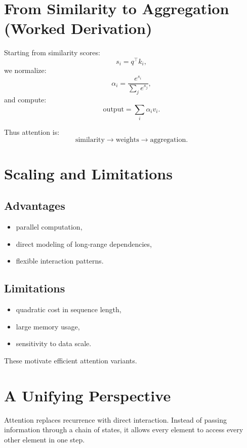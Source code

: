 \section{From Similarity to Aggregation (Worked Derivation)}

Starting from similarity scores:
\[
s_i = q^\top k_i,
\]
we normalize:
\[
\alpha_i = \frac{e^{s_i}}{\sum_j e^{s_j}},
\]
and compute:
\[
\mathrm{output} = \sum_i \alpha_i v_i.
\]

Thus attention is:
\[
\text{similarity} \to \text{weights} \to \text{aggregation}.
\]

\section{Scaling and Limitations}

\subsection{Advantages}

\begin{itemize}
    \item parallel computation,
    \item direct modeling of long-range dependencies,
    \item flexible interaction patterns.
\end{itemize}

\subsection{Limitations}

\begin{itemize}
    \item quadratic cost in sequence length,
    \item large memory usage,
    \item sensitivity to data scale.
\end{itemize}

These motivate efficient attention variants.

\section{A Unifying Perspective}

Attention replaces recurrence with direct interaction. Instead of passing information through a chain of states, it allows every element to access every other element in one step.

